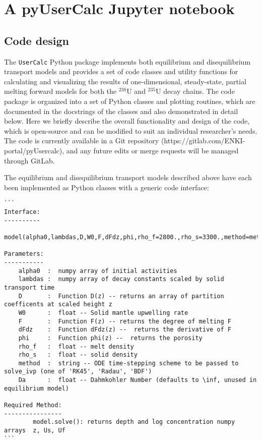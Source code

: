 \documentclass[11pt]{article}
\begin{document}
    \hypertarget{a-pyusercalc-jupyter-notebook}{%
\section{A pyUserCalc Jupyter notebook}\label{a-pyusercalc-jupyter-notebook}}

    \hypertarget{code-design}{%
\subsection{Code design}\label{code-design}}

The \colorbox{gray!20}{\texttt{UserCalc}} Python package implements both equilibrium and disequilibrium transport models and provides a set of code classes and utility functions for calculating and visualizing the results of one-dimensional, steady-state, partial melting forward models for both the $^{238}$U and $^{235}$U decay chains. The code package is organized into a set of Python classes and plotting routines, which are documented in the docstrings of the classes and also demonstrated in detail below. Here we briefly describe the overall functionality and design of the code, which is open-source and can be modified to suit an individual researcher's needs. The code is currently available in a Git repository (https://gitlab.com/ENKI-portal/pyUsercalc), and any future edits or merge requests will be managed through GitLab.

The equilibrium and disequilibrium transport models described above have each been implemented as Python classes with a generic code interface:
\bigskip
\begin{lstlisting}
```
Interface:
----------
    model(alpha0,lambdas,D,W0,F,dFdz,phi,rho_f=2800.,rho_s=3300.,method=method,Da=inf)

Parameters:
-----------
    alpha0  :  numpy array of initial activities
    lambdas :  numpy array of decay constants scaled by solid transport time
    D       :  Function D(z) -- returns an array of partition coefficents at scaled height z
    W0      :  float -- Solid mantle upwelling rate
    F       :  Function F(z) -- returns the degree of melting F  
    dFdz    :  Function dFdz(z) --  returns the derivative of F  
    phi     :  Function phi(z) --  returns the porosity  
    rho_f   :  float -- melt density
    rho_s   :  float -- solid density
    method  :  string -- ODE time-stepping scheme to be passed to solve_ivp (one of 'RK45', 'Radau', 'BDF')
    Da      :  float -- Dahmkohler Number (defaults to \inf, unused in equilibrium model)

Required Method:
----------------
        model.solve(): returns depth and log concentration numpy arrays  z, Us, Uf
```
\end{lstlisting}
\bigskip
\end{document}
